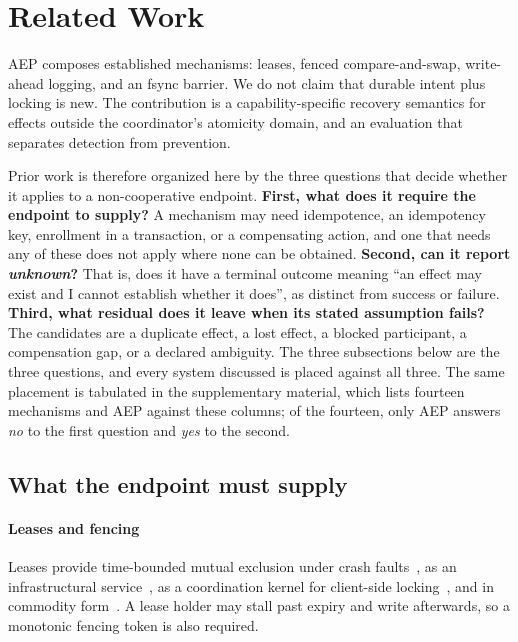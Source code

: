 \section{Related Work}
\label{sec:related}

AEP composes established mechanisms: leases, fenced compare-and-swap,
write-ahead logging, and an fsync barrier. We do not claim that durable intent
plus locking is new. The contribution is a capability-specific recovery
semantics for effects outside the coordinator's atomicity domain, and an
evaluation that separates detection from prevention.

Prior work is therefore organized here by the three questions that decide
whether it applies to a non-cooperative endpoint. \textbf{First, what does it
require the endpoint to supply?} A mechanism may need idempotence, an
idempotency key, enrollment in a transaction, or a compensating action, and one
that needs any of these does not apply where none can be obtained. \textbf{Second, can it
report \emph{unknown}?} That is, does it have a terminal outcome meaning
``an effect may exist and I cannot establish whether it does'', as distinct from
success or failure. \textbf{Third, what residual does it leave when its stated
assumption fails?} The candidates are a duplicate effect, a lost effect, a
blocked participant, a compensation gap, or a declared ambiguity. The three subsections below are the
three questions, and every system discussed is placed against all three. The
same placement is tabulated in the supplementary material, which lists fourteen
mechanisms and AEP against these columns; of the fourteen, only AEP answers
\emph{no} to the first question and \emph{yes} to the second.

\subsection{What the endpoint must supply}

\paragraph{Leases and fencing} Leases provide time-bounded mutual exclusion
under crash faults~\cite{gray1989leases}, as an infrastructural
service~\cite{burrows2006chubby}, as a coordination kernel for client-side
locking~\cite{hunt2010zookeeper}, and in commodity form~\cite{redis-locks}. A
lease holder may stall past expiry and write afterwards, so a monotonic fencing
token is also required.

